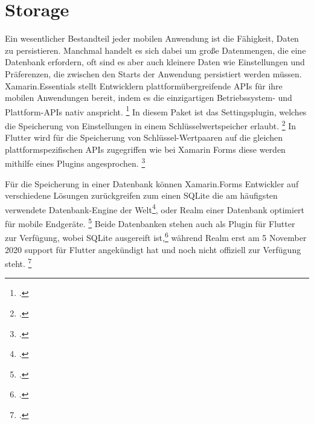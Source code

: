 \section{Storage}
Ein wesentlicher Bestandteil jeder mobilen Anwendung ist die Fähigkeit,  Daten zu persistieren.  Manchmal handelt es sich dabei um große Datenmengen,  die eine Datenbank erfordern,  oft sind es aber auch kleinere Daten wie Einstellungen und Präferenzen, die zwischen den Starts der Anwendung persistiert werden müssen.   
Xamarin.Essentials stellt Entwicklern plattformübergreifende APIs für ihre mobilen Anwendungen bereit,  indem es die einzigartigen Betriebssystem- und Plattform-APIs nativ anspricht. \footcite[Vgl.][Abgerufen am \today]{MicrosoftXamEssentials2020} In diesem Paket ist das Settingsplugin, welches die Speicherung von Einstellungen in einem Schlüsselwertspeicher erlaubt.  \footcite[Vgl.][Abgerufen am \today]{MicrosoftXamSettings2019} In Flutter wird für die Speicherung von Schlüssel-Wertpaaren auf die gleichen plattformspezifischen APIs zugegriffen wie bei Xamarin Forms diese werden mithilfe eines Plugins angesprochen.  \footcite[Vgl.][Abgerufen am \today]{GoogleFlutterSharedPreferences2020} 

Für die Speicherung in einer Datenbank können Xamarin.Forms Entwickler auf verschiedene Lösungen zurückgreifen zum einen SQLite  die am häufigsten verwendete Datenbank-Engine der Welt\footcite[Vgl.][Abgerufen am \today]{SQLiteConsortium2020},  oder Realm einer Datenbank optimiert für mobile Endgeräte. \footcite[Vgl.][Abgerufen am \today]{MongoDBRealm2020} Beide Datenbanken stehen auch als Plugin für Flutter zur Verfügung, wobei SQLite ausgereift ist,\footcite[Vgl.][Abgerufen am \today]{Tekartik2020} während Realm erst am 5 November 2020 support für Flutter angekündigt hat und noch nicht offiziell zur Verfügung steht. \footcite[Vgl.][Abgerufen am \today]{MongoDBFlutterSupport2020}
